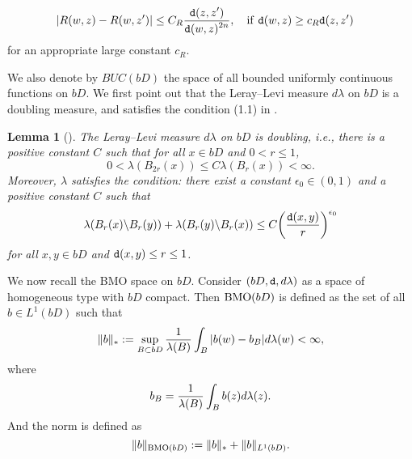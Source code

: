 \documentclass[11pt,a4paper]{amsart}
\numberwithin{equation}{section}
\newtheorem{lemma}[theorem]{Lemma}
\begin{document}
{\begin{equation}
\begin{split}
& |R(w,z)-R(w,z')|\leq C_R {\displaystyle{\tt d}(z,z')\over\displaystyle {\tt d}(w,z)^{2n}},\quad {\rm if\ }  {\tt d}(w,z)\geq c_R {\tt d}(z,z')
                \end{split}
\end{equation}
for an appropriate large constant $c_R$.

We also denote by $BUC(bD)$ the space of all bounded uniformly continuous functions on $bD$.
We first point out that the Leray--Levi measure $d\lambda$ on $bD$ is a doubling measure, and  satisfies
the condition (1.1) in \cite{KL2}.
{
\begin{lemma}[\cite{DLLWW}]\label{measure lambda}
The Leray--Levi measure $d\lambda$ on $bD$ is doubling, i.e., there is a positive constant $C$ such that for all $x\in bD$ and $0<r\leq1$,
$$ 0<\lambda(B_{2r}(x))\leq C\lambda(B_{r}(x))<\infty. $$
Moreover, $\lambda$
satisfies the condition: there exist a constant $\epsilon_0\in(0,1)$ and a positive constant $C$ such that
$$ \lambda( B_r(x)\backslash B_r(y) ) +  \lambda( B_r(y)\backslash B_r(x) ) \leq C\bigg( { {\tt d}(x,y) \over r}  \bigg)^{\epsilon_0}   $$
for all $x,y\in bD$ and ${\tt d}(x,y)\leq r\leq1$.
\end{lemma}
}


 We now recall the BMO space on $bD$.
 Consider $(bD, {\tt d}, d\lambda)$ as a space of homogeneous type with $bD$ compact.
Then ${\rm BMO }(bD)$ is defined as the set of all $b\in L^1(bD)$ such that
$$ \|b\|_*:=\sup_{ B\subset bD} {1\over\lambda(B)}\int_{B} |b(w)-b_B|d\lambda(w)<\infty, $$
where
\begin{align}\label{fb}
b_B={1\over \lambda(B)}\int_B b(z)d\lambda(z).
\end{align}
And the norm is defined as
$$\|b\|_{{\rm BMO }(bD)}:=\|b\|_*+ \|b\|_{L^1(bD)}. $$



}
\end{document}
